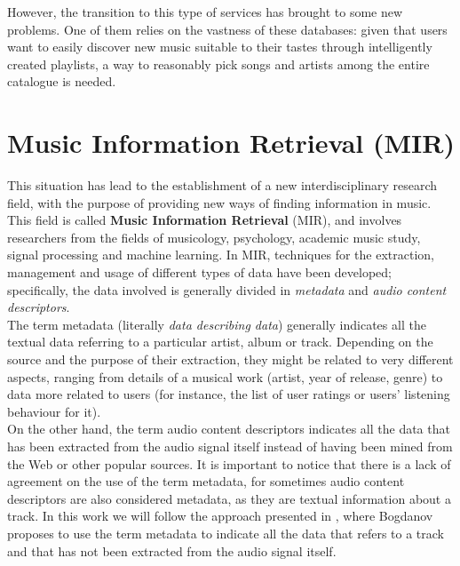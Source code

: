 However, the transition to this type of services has brought to some new problems. One of them relies on the vastness of these databases: given that users want to easily discover new music suitable to their tastes through intelligently created playlists, a way to reasonably pick songs and artists among the entire catalogue is needed. \\

\section{Music Information Retrieval (MIR)}
This situation has lead to the establishment of a new interdisciplinary research field, with the purpose of providing new ways of finding information in music. This field is called \textbf{Music Information Retrieval} (MIR), and involves researchers from the fields of musicology, psychology, academic music study, signal processing and machine learning. In MIR, techniques for the extraction, management and usage of different types of data have been developed; specifically, the data involved is generally divided in \textit{metadata} and \textit{audio content descriptors}. \\
The term metadata (literally \textit{data describing data}) generally indicates all the textual data referring to a particular artist, album or track. Depending on the source and the purpose of their extraction, they might be related to very different aspects, ranging from details of a musical work (artist, year of release, genre) to data more related to users (for instance, the list of user ratings or users' listening behaviour for it). \\
On the other hand, the term audio content descriptors indicates all the data that has been extracted from the audio signal itself instead of having been mined from the Web or other popular sources. It is important to notice that there is a lack of agreement on the use of the term metadata, for sometimes audio content descriptors are also considered metadata, as they are textual information about a track. In this work we will follow the approach presented in \cite{bogdanov13}, where Bogdanov proposes to use the term metadata to indicate all the data that refers to a track and that has not been extracted from the audio signal itself.\\
